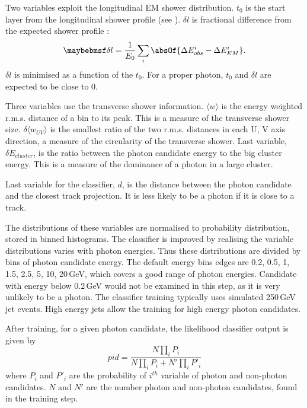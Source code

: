 Two variables exploit the longitudinal EM shower distribution. $t_0$ is the start layer from the longitudinal shower profile (see ). $\delta{l}$ is fractional difference from the expected shower profile \cite{Thomson:2009rp}:
\begin{equation}
\delta l = \frac{1}{E_0}\sum_{i}^{}\absOf{\Delta E_{obs}^i - \Delta E_{EM}^i }.
\end{equation}
$\delta l$ is minimised as a function of the $t_0$. For a proper photon, $t_0$  and $\delta l $ are expected to be close to 0.

Three variables use the transverse shower information. $\langle{w}\rangle$ is the energy weighted r.m.s. distance of a bin to its peak. This is a measure of the transverse shower size. $\delta{\langle{w_{UV}}\rangle}$ is the smallest ratio of the two r.m.s. distances in each U, V axis direction, a measure of the circularity of the transverse shower. Last variable, $\delta E_{cluster}$, is the  ratio between the photon candidate energy to the big cluster energy. This is a measure of the dominance of a photon in a large cluster.

Last variable for the classifier, $d$, is the distance between the photon candidate and the closest track projection. It is less likely to be a photon if it is close to a track.

The distributions of these variables are normalised to probability distribution, stored in binned histograms. The classifier is improved by realising the variable distributions varies with photon energies. Thus these distributions are divided by bins of photon candidate energy. The default energy bins edges are 0.2, 0.5, 1, 1.5, 2.5, 5, 10, 20\,GeV, which covers a good range of photon energies. Candidate with energy below 0.2\,GeV would not be examined in this step, as it is very unlikely to be a photon. The classifier training typically uses simulated 250\,GeV jet events. High energy jets allow the training for high energy photon candidates.

After training, for a given photon candidate, the likelihood classifier output is given by
\begin{equation}
pid = \frac{N\prod_{i}{P_i}}{N\prod_{i}{P_i} + N'\prod_{i}{P'_i}}
\end{equation}
where $P_i$ and $P'_i$ are the probability of $i^{th}$ variable of photon and non-photon candidates. $N$ and $N'$ are the number photon and non-photon candidates, found in the training step.

